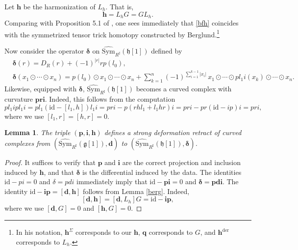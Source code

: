 \documentclass[12pt]{amsart}
\newtheorem{lem}[defn]{Lemma}
\numberwithin{equation}{section}
\theoremstyle{plain}
\newcommand{\bfd}{\mathbf{d}}
\newcommand{\bfi}{\mathbf{i}}
\newcommand{\bfh}{\mathbf{h}}
\newcommand{\bfp}{\mathbf{p}}
\newcommand{\bfq}{\mathbf{q}}
\newcommand{\bfr}{\mathbf{r}}
\newcommand{\bfdelta}{\bm{\delta}}
\newcommand{\fg}{\mathfrak{g}}
\newcommand{\fh}{\mathfrak{h}}
\newcommand{\Sym}{\mathrm{Sym}}
\newcommand{\id}{\mathrm{id}}
\newcommand{\wSym}{\widehat{\Sym}}
\newcommand{\uR}{{R^\sharp}}
\begin{document}
	Let $\bfh$ be the harmonization of $L_h$. That is,
	\begin{equation}\label{bfh}
		\bfh = L_h G = G L_h.
	\end{equation}
	Comparing with Proposition 5.1 of \cite{berglund2014homological}, one sees immediately that \eqref{bfh} coincides with the symmetrized tensor trick homotopy constructed by Berglund.\footnote{In his notation, $\bfh^\Sigma$ corresponds to our $\bfh$, $\bfq$ corresponds to $G$, and $\bfh^{\mathrm{der}}$ corresponds to $L_h$.}

	Now consider the operator $\bfdelta$ on $\wSym_\uR(\fh[1])$ defined by
	\begin{align*}
		&\bfdelta(r)= D_R(r) + (-1)^{|r|}r p(l_0), \\
		&\bfdelta (x_1 \odot \cdots \odot x_n)
		= p(l_0) \odot x_1 \odot \cdots \odot x_n + \sum_{k=1}^n (-1)^{\sum_{i=1}^{k-1}|x_i|}\,
		x_1 \odot \cdots \odot pl_1i(x_k)\odot \cdots \odot x_n.
	\end{align*}
	Likewise, equipped with $\bfdelta$, $\wSym_\uR(\fh[1])$ becomes a curved complex with curvature $\bfp \bfr \bfi$. Indeed, this follows from the computation
	\[
	pl_1 ip l_1 i = p l_1(\id - [l_1, h])l_1 i = pri - p(rhl_1+l_1hr)i = pri - pr(\id-ip)i = pri,
	\]
	where we use $[l_1, r]=[h,r]=0$.
	
	\begin{lem}
		The triple $(\bfp, \bfi, \bfh)$ defines a strong deformation retract of curved complexes from $(\wSym_\uR(\fg[1]), \bfd)$ to $(\wSym_\uR(\fh[1]), \bfdelta)$.
	\end{lem}
	\begin{proof}
		It suffices to verify that $\bfp$ and $\bfi$ are the correct projection and inclusion induced by $\bfh$, and that $\bfdelta$ is the differential induced by the data. The identities $\id - pi =0$ and $\delta = p d i$ immediately imply that $\id - \bfp \bfi = 0$ and $\bfdelta = \bfp \bfd \bfi$. The identity $\id - \bfi\bfp = [\bfd, \bfh]$ follows from Lemma \ref{berg}. Indeed,
		\[
		[\bfd, \bfh] = [\bfd, L_h] G = \id - \bfi\bfp,
		\]
		where we use $[\bfd, G]=0$ and $[\bfh, G]=0$.
	\end{proof}
	
\end{document}
